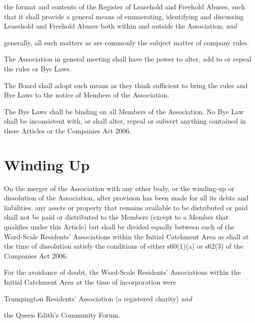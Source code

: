\documentclass[12pt]{article}
\newcommand{\EC}[0]{Board}
\newcommand{\Exec}[0]{\EC{} }
\newcommand{\WSRA}[0]{Ward-Scale Residents' Association}
\newcommand{\LAFA}[0]{Leasehold and Freehold Abuses}
\newcommand{\ITand}[0]{\textit{and}}
\begin{document}
\begin{constenum}
\begin{constenum}
\item the format and contents of the Register of \LAFA, such that
  it shall provide a general means of enumerating, identifying and
  discussing \LAFA{} both within and outside the Association; \ITand

\item generally, all such matters as are commonly the subject matter
  of company rules.

\end{constenum}

\item The Association in general meeting shall have the power to
  alter, add to or repeal the rules or Bye Laws.

\item The \Exec shall adopt such means as they think sufficient to
  bring the rules and Bye Laws to the notice of Members of the Association.

\item The Bye Laws shall be binding on all Members of the
  Association. No Bye Law shall be inconsistent with, or shall
  alter, repeal or subvert anything contained in these Articles or
  the Companies Act 2006.
\end{constenum}


\section{Winding Up}

\begin{constenum}

\item On the merger of the Association with any other body, or the
  winding-up or dissolution of the Association, after provision has
  been made for all its debts and liabilities, any assets or property
  that remains available to be distributed or paid shall not be paid
  or distributed to the Members (except to a Member that qualifies
  under this Article) but shall be divided equally between such of the
  \WSRA{}s within the Initial Catchment Area as shall at the time of
  dissolution satisfy the conditions of either s60(1)(a) or s62(3)
  of the Companies Act 2006.

\item For the avoidance of doubt, the \WSRA{}s within the Initial
  Catchment Area at the time of incorporation were
  \begin{constenum}
    \item Trumpington Residents' Association (a registered charity) \ITand
    \item the Queen Edith's Community Forum.
  \end{constenum}

\end{constenum}
\end{document}
